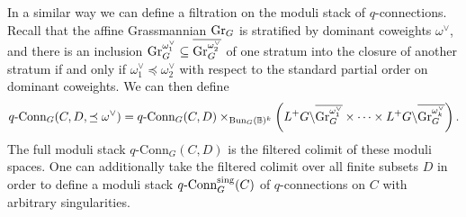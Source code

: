 \documentclass[10pt, oneside]{article}
\newcommand{\qconn}{q\text{-Conn}}
\begin{document}
\begin{remark}\label{ind_structure_remark}
In a similar way we can define a filtration on the moduli stack of $q$-connections.  Recall that the affine Grassmannian $\operatorname{Gr}_G$ is stratified by dominant coweights $\omega^\vee$, and there is an inclusion $\operatorname{Gr}_G^{\omega^\vee_1}\subseteq \overline{\operatorname{Gr}_G^{\omega^\vee_2}}$ of one stratum into the closure of another stratum if and only if $\omega^\vee_1 \preceq \omega^\vee_2$ with respect to the standard partial order on dominant coweights.  We can then define
\[\qconn_G(C,D, \preceq \omega^\vee) = \qconn_G(C,D) \times_{\bun_G(\bb B)^k} \left(L^+G \!\!\bs\!\! \ol{\Gr_G^{\omega^\vee_1}} \times \cdots \times L^+G \!\!\bs\!\! \ol{\Gr_G^{\omega^\vee_k}}\right).\]
The full moduli stack $\qconn_G(C,D)$ is the filtered colimit of these moduli spaces.  One can additionally take the filtered colimit over all finite subsets $D$ in order to define a moduli stack $\qconn^\mr{sing}_G(C)$ of $q$-connections on $C$ with arbitrary singularities.
\end{remark}
\end{document}

